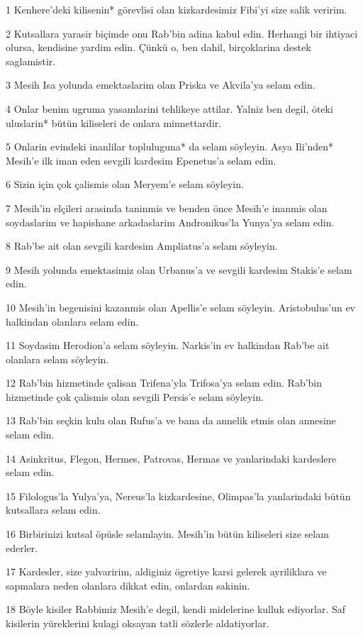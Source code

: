 \par 1 Kenhere'deki kilisenin* görevlisi olan kizkardesimiz Fibi'yi size salik veririm.
\par 2 Kutsallara yarasir biçimde onu Rab'bin adina kabul edin. Herhangi bir ihtiyaci olursa, kendisine yardim edin. Çünkü o, ben dahil, birçoklarina destek saglamistir.
\par 3 Mesih Isa yolunda emektaslarim olan Priska ve Akvila'ya selam edin.
\par 4 Onlar benim ugruma yasamlarini tehlikeye attilar. Yalniz ben degil, öteki uluslarin* bütün kiliseleri de onlara minnettardir.
\par 5 Onlarin evindeki inanlilar topluluguna* da selam söyleyin. Asya Ili'nden* Mesih'e ilk iman eden sevgili kardesim Epenetus'a selam edin.
\par 6 Sizin için çok çalismis olan Meryem'e selam söyleyin.
\par 7 Mesih'in elçileri arasinda taninmis ve benden önce Mesih'e inanmis olan soydaslarim ve hapishane arkadaslarim Andronikus'la Yunya'ya selam edin.
\par 8 Rab'be ait olan sevgili kardesim Ampliatus'a selam söyleyin.
\par 9 Mesih yolunda emektasimiz olan Urbanus'a ve sevgili kardesim Stakis'e selam edin.
\par 10 Mesih'in begenisini kazanmis olan Apellis'e selam söyleyin. Aristobulus'un ev halkindan olanlara selam edin.
\par 11 Soydasim Herodion'a selam söyleyin. Narkis'in ev halkindan Rab'be ait olanlara selam söyleyin.
\par 12 Rab'bin hizmetinde çalisan Trifena'yla Trifosa'ya selam edin. Rab'bin hizmetinde çok çalismis olan sevgili Persis'e selam söyleyin.
\par 13 Rab'bin seçkin kulu olan Rufus'a ve bana da annelik etmis olan annesine selam edin.
\par 14 Asinkritus, Flegon, Hermes, Patrovas, Hermas ve yanlarindaki kardeslere selam edin.
\par 15 Filologus'la Yulya'ya, Nereus'la kizkardesine, Olimpas'la yanlarindaki bütün kutsallara selam edin.
\par 16 Birbirinizi kutsal öpüsle selamlayin. Mesih'in bütün kiliseleri size selam ederler.
\par 17 Kardesler, size yalvaririm, aldiginiz ögretiye karsi gelerek ayriliklara ve sapmalara neden olanlara dikkat edin, onlardan sakinin.
\par 18 Böyle kisiler Rabbimiz Mesih'e degil, kendi midelerine kulluk ediyorlar. Saf kisilerin yüreklerini kulagi oksayan tatli sözlerle aldatiyorlar.
